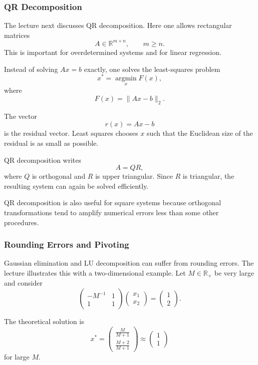 \documentclass[10pt, letterpaper]{article}
\newcommand{\R}{\mathbb{R}}
\begin{document}
\subsubsection{QR Decomposition}

The lecture next discusses QR decomposition. Here one allows rectangular matrices
\[
A\in\R^{m\times n},
\qquad
m\geq n.
\]
This is important for overdetermined systems and for linear regression.

Instead of solving \(Ax=b\) exactly, one solves the least-squares problem
\[
x^\ast
=
\operatorname*{argmin}_{x} F(x),
\]
where
\[
F(x)=\|Ax-b\|_2.
\]

The vector
\[
r(x)=Ax-b
\]
is the residual vector. Least squares chooses \(x\) such that the Euclidean size of the residual is as small as possible.

QR decomposition writes
\[
A=QR,
\]
where \(Q\) is orthogonal and \(R\) is upper triangular. Since \(R\) is triangular, the resulting system can again be solved efficiently.

QR decomposition is also useful for square systems because orthogonal transformations tend to amplify numerical errors less than some other procedures.

\subsubsection{Rounding Errors and Pivoting}

Gaussian elimination and LU decomposition can suffer from rounding errors. The lecture illustrates this with a two-dimensional example. Let \(M\in\R_+\) be very large and consider
\[
\begin{pmatrix}
-M^{-1} & 1\\
1 & 1
\end{pmatrix}
\begin{pmatrix}
x_1\\
x_2
\end{pmatrix}
=
\begin{pmatrix}
1\\
2
\end{pmatrix}.
\]

The theoretical solution is
\[
x^\ast
=
\begin{pmatrix}
\frac{M}{M+1}\\
\frac{M+2}{M+1}
\end{pmatrix}
\approx
\begin{pmatrix}
1\\
1
\end{pmatrix}
\]
for large \(M\).
\end{document}
